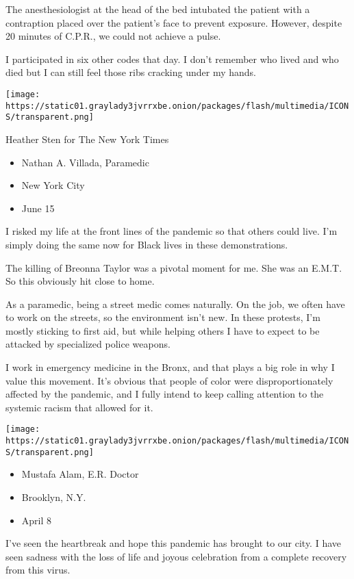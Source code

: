 The anesthesiologist at the head of the bed intubated the patient with a
contraption placed over the patient's face to prevent exposure. However,
despite 20 minutes of C.P.R., we could not achieve a pulse.

I participated in six other codes that day. I don't remember who lived
and who died but I can still feel those ribs cracking under my hands.

\texttt{[image: https://static01.graylady3jvrrxbe.onion/packages/flash/multimedia/ICONS/transparent.png]}

Heather Sten for The New York Times

\begin{itemize}
\tightlist
\item
  Nathan A. Villada, Paramedic
\item
  New York City
\item
  June 15
\end{itemize}

I risked my life at the front lines of the pandemic so that others could
live. I'm simply doing the same now for Black lives in these
demonstrations.

The killing of Breonna Taylor was a pivotal moment for me. She was an
E.M.T. So this obviously hit close to home.

As a paramedic, being a street medic comes naturally. On the job, we
often have to work on the streets, so the environment isn't new. In
these protests, I'm mostly sticking to first aid, but while helping
others I have to expect to be attacked by specialized police weapons.

I work in emergency medicine in the Bronx, and that plays a big role in
why I value this movement. It's obvious that people of color were
disproportionately affected by the pandemic, and I fully intend to keep
calling attention to the systemic racism that allowed for it.

\texttt{[image: https://static01.graylady3jvrrxbe.onion/packages/flash/multimedia/ICONS/transparent.png]}

\begin{itemize}
\tightlist
\item
  Mustafa Alam, E.R. Doctor
\item
  Brooklyn, N.Y.
\item
  April 8
\end{itemize}

I've seen the heartbreak and hope this pandemic has brought to our city.
I have seen sadness with the loss of life and joyous celebration from a
complete recovery from this virus.

